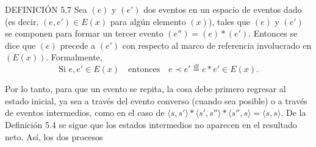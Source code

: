 \begin{justifying}
    \bigskip

    \noindent DEFINICIÓN 5.7 Sea $(e)$ y $(e')$ dos eventos en un espacio de eventos dado (es decir, $(e,e')\in E(x)$ para algún elemento $(x)$), tales que $(e)$ y $(e')$ se componen para formar un tercer evento $(e'') = (e)\ast (e')$. 
    Entonces se dice que $(e)$ precede a $(e')$ con respecto al marco de referencia involucrado en $(E(x))$. Formalmente,
    \[
    \text{Si } e,e'\in E(x)\quad\text{entonces}\quad
    e\prec e'\overset{\mathrm{df}}{=} e\ast e'\in E(x).
    \]

    Por lo tanto, para que un evento se repita, la cosa debe primero regresar al estado inicial, ya sea a través del 
    evento converso (cuando sea posible) o a través de eventos intermedios, como en el caso de $\langle s, s' \rangle * \langle s', s'' \rangle * \langle s'', s \rangle = \langle s, s \rangle$. 
    De la Definición 5.4 se sigue que los estados intermedios no aparecen en el resultado neto. Así, los dos procesos
\end{justifying}
